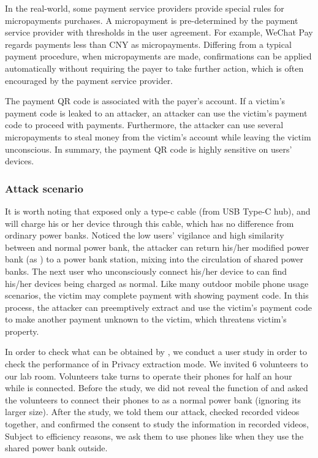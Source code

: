 In the real-world, some payment service providers provide special rules for micropayments purchases. A micropayment is pre-determined by the payment service provider with thresholds in the user agreement. For example, WeChat Pay regards payments less than CNY  as micropayments. Differing from a typical payment procedure, when micropayments are made, confirmations can be applied automatically without requiring the payer to take further action, which is often encouraged by the payment service provider.

The payment QR code is associated with the payer's account. If a victim's payment code is leaked to an attacker, an attacker can use the victim's payment code to proceed with payments. Furthermore, the attacker can use several micropayments to steal money from the victim's account while leaving the victim unconscious. In summary, the payment QR code is highly sensitive on users' devices.

\subsubsection{Attack scenario}

It is worth noting that \tool exposed only a type-c cable (from USB Type-C hub),
and \tool will charge his or her device through this cable, which has no difference from ordinary power banks. Noticed the low users' vigilance and high similarity between \tool and normal power bank, the attacker can return his/her modified power bank (as \tool) to a power bank station, mixing \tool into the circulation of shared power banks. The next user who unconsciously connect his/her device to \tool can find his/her devices being charged as normal.
Like many outdoor mobile phone usage scenarios, the victim may complete payment with showing payment code. In this process, the attacker can preemptively extract and use the victim's payment code to make another payment unknown to the victim, which threatens victim's property.


In order to check what can be obtained by \tool, we conduct a user study in order to check the performance of \tool in Privacy extraction mode. We invited 6 volunteers to our lab room. Volunteers take turns to operate their phones for half an hour while \tool is connected. Before the study, we did not reveal the function of \tool and asked the volunteers to connect their phones to \tool as a normal power bank (ignoring its larger size). 
After the study, we told them our attack, checked recorded videos together, and confirmed the consent to study the information in recorded videos, Subject to efficiency reasons, we ask them to use phones like when they use the shared power bank outside.



